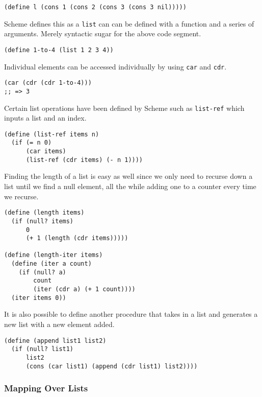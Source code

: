 \documentclass[11pt]{article}
\begin{document}
\begin{verbatim}
(define l (cons 1 (cons 2 (cons 3 (cons 3 nil)))))
\end{verbatim}

Scheme defines this as a \texttt{list} can can be defined with a function and a
series of arguments. Merely syntactic sugar for the above code segment.

\begin{verbatim}
(define 1-to-4 (list 1 2 3 4))
\end{verbatim}

Individual elements can be accessed individually by using \texttt{car} and
\texttt{cdr}.

\begin{verbatim}
(car (cdr (cdr 1-to-4)))
;; => 3
\end{verbatim}

Certain list operations have been defined by Scheme such as \texttt{list-ref}
which inputs a list and an index.

\begin{verbatim}
(define (list-ref items n)
  (if (= n 0)
      (car items)
      (list-ref (cdr items) (- n 1))))
\end{verbatim}

Finding the length of a list is easy as well since we only need to
recurse down a list until we find a null element, all the while adding
one to a counter every time we recurse.

\begin{verbatim}
(define (length items)
  (if (null? items)
      0
      (+ 1 (length (cdr items)))))

(define (length-iter items)
  (define (iter a count)
    (if (null? a)
        count
        (iter (cdr a) (+ 1 count))))
  (iter items 0))
\end{verbatim}

It is also possible to define another procedure that takes in a list and
generates a new list with a new element added.

\begin{verbatim}
(define (append list1 list2)
  (if (null? list1)
      list2
      (cons (car list1) (append (cdr list1) list2))))
\end{verbatim}

\subsubsection{Mapping Over Lists}
\label{sec:org970b740}
\end{document}
